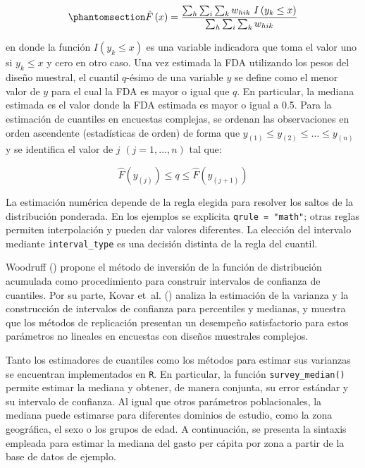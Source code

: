 \documentclass[
  spanish,
  11pt,
  letterpaper,
  oneside,
  open=any]{scrbook}
\begin{document}
\begin{equation}\protect\phantomsection\label{eq-distribucion-ponderada}{
\hat{F}\left(x\right) = \frac{\sum_{h} \sum_{i} \sum_{k} w_{hik} \ I\left(y_{k}\leq x\right)}{\sum_{h}\sum_{i}\sum_{k} w_{hik}}
}\end{equation}

en donde la función \(I\left(y_{k}\leq x\right)\) es una variable
indicadora que toma el valor uno si \(y_k \leq x\) y cero en otro caso.
Una vez estimada la FDA utilizando los pesos del diseño muestral, el
cuantil \(q\)-ésimo de una variable \(y\) se define como el menor valor
de \(y\) para el cual la FDA es mayor o igual que \(q\). En particular,
la mediana estimada es el valor donde la FDA estimada es mayor o igual a
0.5. Para la estimación de cuantiles en encuestas complejas, se ordenan
las observaciones en orden ascendente (estadísticas de orden) de forma
que \(y_{(1)} \leq y_{(2)} \leq \ldots \leq y_{(n)}\) y se identifica el
valor de \(j\) \((j=1,\ldots,n)\) tal que:

\[
\hat{F}\left(y_{(j)}\right)\leq q\leq\hat{F}\left(y_{(j+1)}\right)
\]

La estimación numérica depende de la regla elegida para resolver los
saltos de la distribución ponderada. En los ejemplos se explicita
\texttt{qrule\ =\ "math"}; otras reglas permiten interpolación y pueden
dar valores diferentes. La elección del intervalo mediante
\texttt{interval\_type} es una decisión distinta de la regla del
cuantil.

Woodruff () propone el método de
inversión de la función de distribución acumulada como procedimiento
para construir intervalos de confianza de cuantiles. Por su parte, Kovar
et~al. () analiza la estimación de la
varianza y la construcción de intervalos de confianza para percentiles y
medianas, y muestra que los métodos de replicación presentan un
desempeño satisfactorio para estos parámetros no lineales en encuestas
con diseños muestrales complejos.

Tanto los estimadores de cuantiles como los métodos para estimar sus
varianzas se encuentran implementados en \texttt{R}. En particular, la
función \texttt{survey\_median()} permite estimar la mediana y obtener,
de manera conjunta, su error estándar y su intervalo de confianza. Al
igual que otros parámetros poblacionales, la mediana puede estimarse
para diferentes dominios de estudio, como la zona geográfica, el sexo o
los grupos de edad. A continuación, se presenta la sintaxis empleada
para estimar la mediana del gasto per cápita por zona a partir de la
base de datos de ejemplo.
\end{document}
